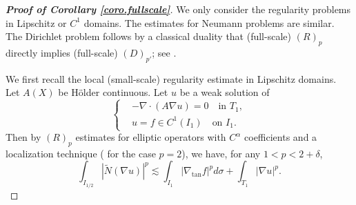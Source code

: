 \documentclass[reqno,12pt]{amsart} %
\theoremstyle{definition}
\theoremstyle{remark}
\numberwithin{equation}{section}
\newcommand{\jz}[1]{\textcolor{red}{#1}}
\begin{document}
\begin{proof}[\textbf{Proof of Corollary \ref{coro.fullscale}}]
    We only consider the regularity problems in Lipschitz or $C^1$ domains. The estimates for Neumann problems are similar. The Dirichlet problem follows by a classical duality that (full-scale) $(R)_p$ directly implies (full-scale) $(D)_{p'}$; see \cite[Theorem 5.4]{KP93}.

    We first recall the local (small-scale) regularity estimate in Lipschitz domains. Let $A(X)$ be H\"{o}lder continuous. Let $u$ be a weak solution of 
    \begin{equation}
    \left\{
    \begin{aligned}
        & -\nabla\cdot (A \nabla u) = 0 \quad \text{in } T_{1}, \\
        & u = f \in C^1(I_1) \quad \text{on }  I_1.
    \end{aligned}
    \right.
    \end{equation}
    Then by $(R)_p$ estimates for elliptic operators with $C^\alpha$ coefficients and a localization technique (\cite[Theorem 8.1]{KS11-2} for the case $p = 2$), we have, for any $1<p<2+\delta$,
    \begin{equation}\label{est.Ca.Rp}
        \int_{I_{1/2}} |\widetilde{N}(\nabla u)|^p \lesssim \int_{I_1} |\nabla_{\tan} f|^p d\sigma + \int_{T_1} |\nabla u|^p.
    \end{equation}


\end{proof}
\end{document}
